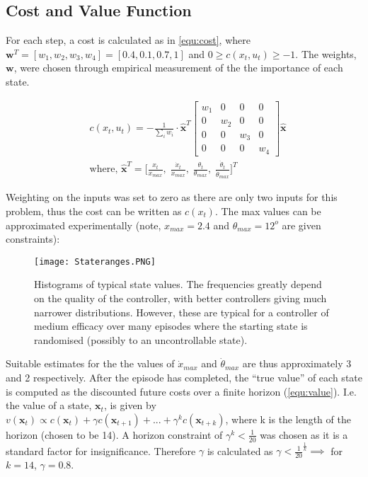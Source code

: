 \documentclass[../main.tex]{subfiles}
\begin{document}
\subsection{Cost and Value Function}

For each step, a cost is calculated as in \cref{equ:cost}, where $\boldsymbol{w}^T = [w_1, w_2, w_3, w_4] = [0.4, 0.1, 0.7, 1]$ and $0 \geq c(x_t, u_t) \geq -1$. The weights, $\boldsymbol{w}$, were chosen through empirical measurement of the the importance of each state.

\begin{align}
   \label{equ:cost}
   &c(x_t, u_t) = - \frac{1}{\sum_{i} w_i} \cdot \boldsymbol{\hat{x}}^T \begin{bmatrix} w_1 & 0 & 0 & 0\\ 0 & w_2 & 0 & 0\\ 0 & 0 & w_3 & 0 \\ 0 & 0 & 0 & w_4 \end{bmatrix}  \boldsymbol{\hat{x}} \\
   &\text{where,   } \boldsymbol{\hat{x}}^T = \bigg[\frac{x_t}{x_{max}}, \; \frac{\dot{x}_t}{\dot{x}_{max}}, \; \frac{\theta_t}{\theta_{max}}, \; \frac{\dot{\theta}_t}{\dot{\theta}_{max}}\bigg]^T
\end{align}

 Weighting on the inputs was set to zero as there are only two inputs for this problem, thus the cost can be written as $c(x_t)$. The max values can be approximated experimentally (note, $x_{max} = 2.4$ and $\theta_{max} = 12^o$ are given constraints):

\begin{figure}[H]
   \centering
   \texttt{[image: Stateranges.PNG]}
   \caption{\label{fig:ranges} Histograms of typical state values. The frequencies greatly depend on the quality of the controller, with better controllers giving much narrower distributions. However, these are typical for a controller of medium efficacy over many episodes where the starting state is randomised (possibly to an uncontrollable state).}
\end{figure}

Suitable estimates for the the values of $\dot{x}_{max}$ and $\dot{\theta}_{max}$ are thus approximately 3 and 2 respectively. After the episode has completed, the ``true value'' of each state is computed as the discounted future costs over a finite horizon (\cref{equ:value}). I.e. the value of a state, $\boldsymbol{x}_t$, is given by $v(\boldsymbol{x}_t) \propto c(\boldsymbol{x}_t) + \gamma c(\boldsymbol{x}_{t+1}) + ... + \gamma^kc(\boldsymbol{x}_{t+k})$, where k is the length of the horizon (chosen to be 14). A horizon constraint of $\gamma^{k} < \frac{1}{20}$ was chosen as it is a standard factor for insignificance. Therefore $\gamma$ is calculated as $\gamma < \frac{1}{20}^{\frac{1}{k}} \implies$ for $k=14$, $\gamma = 0.8$.
\end{document}

